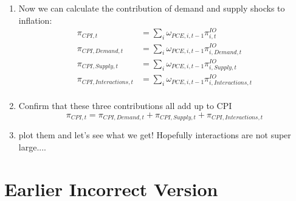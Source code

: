 \documentclass[12pt,english]{article}
\begin{document}
\begin{enumerate}
\begin{itemize}
	\end{itemize}
	Email Nick if they are not equal
	\item Now we can calculate the contribution of demand and supply shocks to inflation:
	\begin{align*}
		\pi_{CPI,t} &= \sum_i \omega_{PCE,i,t-1} \pi_{i,t}^{IO}\\
		\pi_{CPI,Demand,t} &= \sum_i \omega_{PCE,i,t-1} \pi_{i,Demand,t}^{IO}\\
		\pi_{CPI,Supply,t} &=\sum_i \omega_{PCE,i,t-1} \pi_{i,Supply,t}^{IO}\\
		\pi_{CPI,Interactions,t} &=\sum_i \omega_{PCE,i,t-1} \pi_{i,Interactions,t}^{IO}\\
	\end{align*}
	\item Confirm that these three contributions all add up to CPI
	\[
		\pi_{CPI,t} = \pi_{CPI,Demand,t} + \pi_{CPI,Supply,t} + \pi_{CPI,Interactions,t} 
	\]
	\item plot them and let's see what we get! Hopefully interactions are not super large....
\end{enumerate}

\section{Earlier Incorrect Version}
\end{document}
